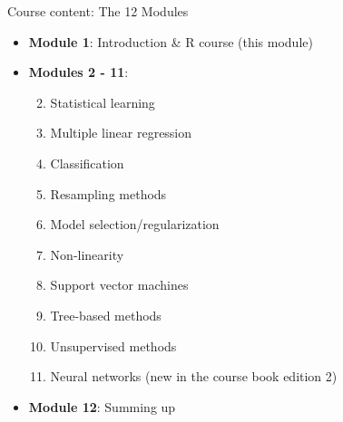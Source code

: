 \documentclass[
  10pt,
  ignorenonframetext,
]{beamer}
\providecommand{\tightlist}{%
  \setlength{\itemsep}{0pt}\setlength{\parskip}{0pt}}
\begin{document}
\begin{frame}
\begin{block}{Course content: The 12 Modules}
\protect\hypertarget{course-content-the-12-modules}{}
\vspace{4mm}

\begin{itemize}
\tightlist
\item
  \textbf{Module 1}: Introduction \& R course (this module)
\end{itemize}

\vspace{2mm}

\begin{itemize}
\tightlist
\item
  \textbf{Modules 2 - 11}:

  \begin{enumerate}
  [1)]
  \setcounter{enumi}{1}
  \tightlist
  \item
    Statistical learning
  \item
    Multiple linear regression
  \item
    Classification
  \item
    Resampling methods
  \item
    Model selection/regularization
  \item
    Non-linearity
  \item
    Support vector machines
  \item
    Tree-based methods
  \item
    Unsupervised methods
  \item
    Neural networks (new in the course book edition 2)
  \end{enumerate}
\end{itemize}

\vspace{2mm}

\begin{itemize}
\tightlist
\item
  \textbf{Module 12}: Summing up
\end{itemize}
\end{block}
\end{frame}
\end{document}
